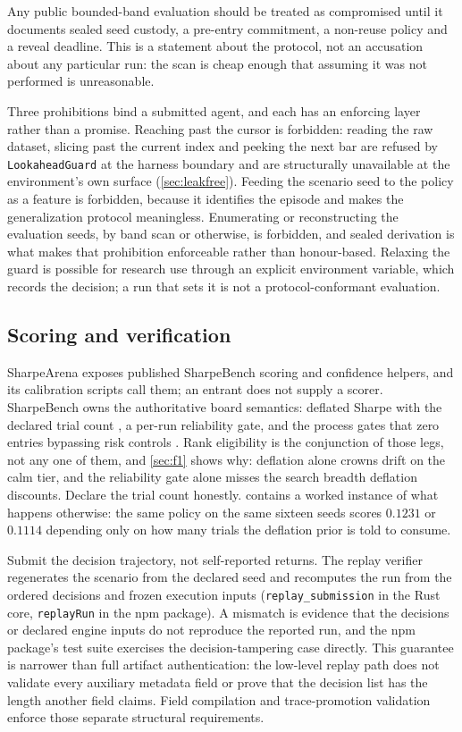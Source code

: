 Any public bounded-band evaluation should be treated as compromised until it documents sealed seed custody, a pre-entry commitment, a non-reuse policy and a reveal deadline. This is a statement about the protocol, not an accusation about any particular run: the scan is cheap enough that assuming it was not performed is unreasonable.

Three prohibitions bind a submitted agent, and each has an enforcing layer rather than a promise. Reaching past the cursor is forbidden: reading the raw dataset, slicing past the current index and peeking the next bar are refused by \texttt{LookaheadGuard} at the harness boundary and are structurally unavailable at the environment's own surface (\cref{sec:leakfree}). Feeding the scenario seed to the policy as a feature is forbidden, because it identifies the episode and makes the generalization protocol meaningless. Enumerating or reconstructing the evaluation seeds, by band scan or otherwise, is forbidden, and sealed derivation is what makes that prohibition enforceable rather than honour-based. Relaxing the guard is possible for research use through an explicit environment variable, which records the decision; a run that sets it is not a protocol-conformant evaluation.

\subsection{Scoring and verification}\label{sec:protocol-scoring}

SharpeArena exposes published SharpeBench scoring and confidence helpers, and its calibration scripts call them; an entrant does not supply a scorer. SharpeBench owns the authoritative board semantics: deflated Sharpe with the declared trial count \citep{bailey2014deflated}, a per-run reliability gate, and the process gates that zero entries bypassing risk controls \citep{toca2026sharpebench}. Rank eligibility is the conjunction of those legs, not any one of them, and \cref{sec:f1} shows why: deflation alone crowns drift on the calm tier, and the reliability gate alone misses the search breadth deflation discounts. Declare the trial count honestly.  contains a worked instance of what happens otherwise: the same policy on the same sixteen seeds scores $0.1231$ or $0.1114$ depending only on how many trials the deflation prior is told to consume.

Submit the decision trajectory, not self-reported returns. The replay verifier regenerates the scenario from the declared seed and recomputes the run from the ordered decisions and frozen execution inputs (\texttt{replay\_submission} in the Rust core, \texttt{replayRun} in the npm package). A mismatch is evidence that the decisions or declared engine inputs do not reproduce the reported run, and the npm package's test suite exercises the decision-tampering case directly. This guarantee is narrower than full artifact authentication: the low-level replay path does not validate every auxiliary metadata field or prove that the decision list has the length another field claims. Field compilation and trace-promotion validation enforce those separate structural requirements.

